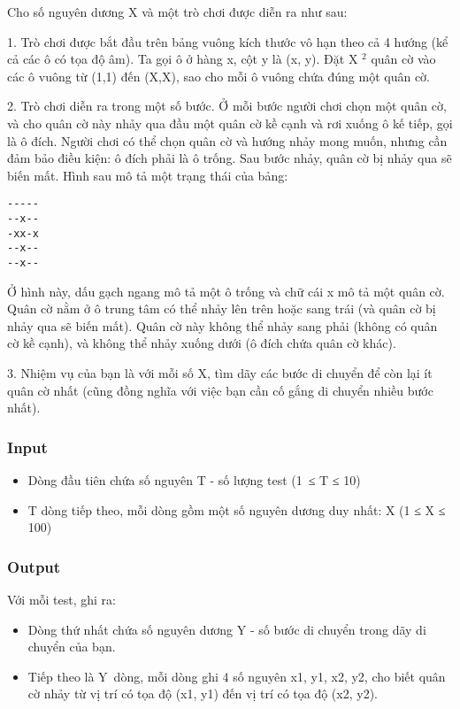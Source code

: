 



    Cho số nguyên dương X và một trò chơi được diễn ra như sau:   

   1. Trò chơi được bắt đầu trên bảng vuông kích thước vô hạn theo cả 4 hướng (kể cả các ô có tọa độ âm). Ta gọi ô ở hàng x, cột y là (x, y). Đặt X   $^    2   $   quân cờ vào các ô vuông từ (1,1) đến (X,X), sao cho mỗi ô vuông chứa đúng một quân cờ.  

   2. Trò chơi diễn ra trong một số bước. Ở mỗi bước người chơi chọn một quân cờ, và cho quân cờ này nhảy qua đầu một quân cờ kề cạnh và rơi xuống ô kế tiếp, gọi là ô đích. Người chơi có thể chọn quân cờ và hướng nhảy mong muốn, nhưng cần đảm bảo điều kiện: ô đích phải là ô trống. Sau bước nhảy, quân cờ bị nhảy qua sẽ biến mất. Hình sau mô tả một trạng thái của bảng:  
\begin{verbatim}
-----
--x--
-xx-x
--x--
--x--\end{verbatim}

   Ở hình này, dấu gạch ngang mô tả một ô trống và chữ cái x mô tả một quân cờ. Quân cờ nằm ở ô trung tâm có thể nhảy lên trên hoặc sang trái (và quân cờ bị nhảy qua sẽ biến mất). Quân cờ này không thể nhảy sang phải (không có quân cờ kề cạnh), và không thể nhảy xuống dưới (ô đích chứa quân cờ khác).  

   3. Nhiệm vụ của bạn là với mỗi số X, tìm dãy các bước di chuyển để còn lại ít quân cờ nhất (cũng đồng nghĩa với việc bạn cần cố gắng di chuyển nhiều bước nhất).  

\subsubsection{   Input  }
\begin{itemize}
	\item     Dòng đầu tiên chứa số nguyên T - số lượng test (1 ≤ T ≤ 10)   
	\item     T dòng tiếp theo, mỗi dòng gồm một số nguyên dương duy nhất: X (1 ≤ X ≤ 100)   
\end{itemize}

\subsubsection{   Output  }

   Với mỗi test, ghi ra:  
\begin{itemize}
	\item     Dòng thứ nhất chứa số nguyên dương Y - số bước di chuyển trong dãy di chuyển của bạn.   
	\item     Tiếp theo là Y dòng, mỗi dòng ghi 4 số nguyên x1, y1, x2, y2, cho biết quân cờ nhảy từ vị trí có tọa độ (x1, y1) đến vị trí có tọa độ (x2, y2).   
\end{itemize}

